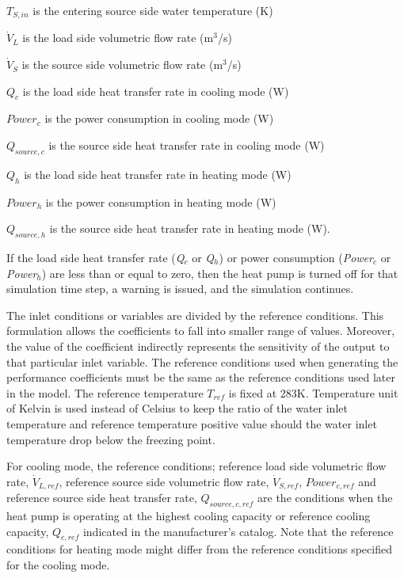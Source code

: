 \({T_{S,in}}\) is the entering source side water temperature (K)

\({\dot V_L}\) is the load side volumetric flow rate (m\(^{3}\)/s)

\({\dot V_S}\) is the source side volumetric flow rate (m\(^{3}\)/s)

\({Q_c}\) is the load side heat transfer rate in cooling mode (W)

\(Powe{r_c}\) is the power consumption in cooling mode (W)

\({Q_{source,c}}\) is the source side heat transfer rate in cooling mode (W)

\({Q_h}\) is the load side heat transfer rate in heating mode (W)

\(Powe{r_h}\) is the power consumption in heating mode (W)

\({Q_{source,h}}\) is the source side heat transfer rate in heating mode (W).

If the load side heat transfer rate (\emph{Q\(_{c}\)} or \emph{Q\(_{h}\)}) or power consumption (\emph{Power\(_{c}\)} or \emph{Power\(_{h}\)}) are less than or equal to zero, then the heat pump is turned off for that simulation time step, a warning is issued, and the simulation continues.

The inlet conditions or variables are divided by the reference conditions. This formulation allows the coefficients to fall into smaller range of values. Moreover, the value of the coefficient indirectly represents the sensitivity of the output to that particular inlet variable. The reference conditions used when generating the performance coefficients must be the same as the reference conditions used later in the model. The reference temperature \({T_{ref}}\) is fixed at 283K. Temperature unit of Kelvin is used instead of Celsius to keep the ratio of the water inlet temperature and reference temperature positive value should the water inlet temperature drop below the freezing point.

For cooling mode, the reference conditions; reference load side volumetric flow rate, \({\dot V_{L,ref}}\), reference source side volumetric flow rate, \({\dot V_{S,ref}}\), \(Powe{r_{c,ref}}\) and reference source side heat transfer rate, \({Q_{source,c,ref}}\) are the conditions when the heat pump is operating at the highest cooling capacity or reference cooling capacity, \({Q_{c,ref}}\) indicated in the manufacturer's catalog. Note that the reference conditions for heating mode might differ from the reference conditions specified for the cooling mode.

